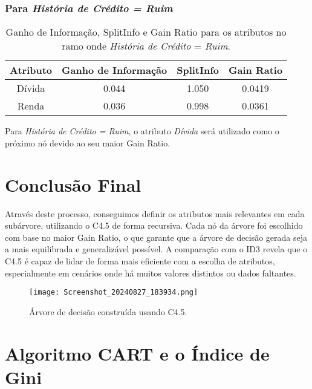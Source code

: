 \documentclass[a4paper,12pt]{article}
\begin{document}
\subsubsection{Para \textit{História de Crédito = Ruim}}

\begin{table}[H]
\centering
\begin{tabular}{|c|c|c|c|}
\hline
\textbf{Atributo} & \textbf{Ganho de Informação} & \textbf{SplitInfo} & \textbf{Gain Ratio} \\
\hline
Dívida & 0.044 & 1.050 & 0.0419 \\
\hline
Renda & 0.036 & 0.998 & 0.0361 \\
\hline
\end{tabular}
\caption{Ganho de Informação, SplitInfo e Gain Ratio para os atributos no ramo onde \textit{História de Crédito} = \textit{Ruim}.}
\label{tab:gain-ratio-hist-ruim}
\end{table}

Para \textit{História de Crédito = Ruim}, o atributo \textit{Dívida} será utilizado como o próximo nó devido ao seu maior Gain Ratio.

\section{Conclusão Final}

Através deste processo, conseguimos definir os atributos mais relevantes em cada subárvore, utilizando o C4.5 de forma recursiva. Cada nó da árvore foi escolhido com base no maior Gain Ratio, o que garante que a árvore de decisão gerada seja a mais equilibrada e generalizável possível. A comparação com o ID3 revela que o C4.5 é capaz de lidar de forma mais eficiente com a escolha de atributos, especialmente em cenários onde há muitos valores distintos ou dados faltantes.

\begin{figure}[H]
    \centering
    \texttt{[image: Screenshot\_20240827\_183934.png]} %
    \caption{Árvore de decisão construída usando C4.5.}
    \label{fig:arvore-c45}
\end{figure}











\section{Algoritmo CART e o Índice de Gini}
\end{document}
